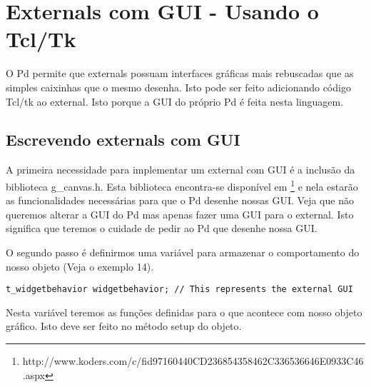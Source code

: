 
\chapter{Externals com GUI - Usando o Tcl/Tk}

O Pd permite que externals possuam interfaces gráficas mais rebuscadas que as simples
caixinhas que o mesmo desenha. Isto pode ser feito adicionando código Tcl/tk ao external.
Isto porque a GUI do próprio Pd é feita nesta linguagem.

\section{Escrevendo externals com GUI}

A primeira necessidade para implementar um external com GUI é a inclusão da biblioteca g\_canvas.h. Esta biblioteca
encontra-se disponível em \footnote{http://www.koders.com/c/fid97160440CD236854358462C336536646E0933C46.aspx} e nela estarão
as funcionalidades necessárias para que o Pd desenhe nossas GUI. Veja que não queremos alterar a GUI do Pd mas
apenas fazer uma GUI para o external. Isto significa que teremos o cuidade de pedir ao Pd que desenhe nossa GUI.

O segundo passo é definirmos uma variável para armazenar o comportamento do nosso objeto (Veja o exemplo 14).

\begin{lstlisting}
t_widgetbehavior widgetbehavior; // This represents the external GUI
\end{lstlisting}

Nesta variável teremos as funções definidas para o que acontece com nosso objeto gráfico. Isto deve ser 
feito no método setup do objeto.

